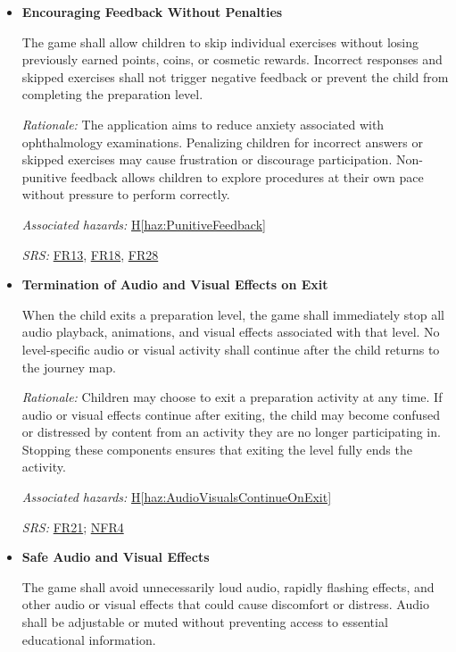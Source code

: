 \documentclass{article}
\newcounter{hazard}
\newcommand{\hazref}[1]{\hyperref[haz:#1]{H\ref*{haz:#1}}}
\newcounter{sr}
\newcommand{\srdef}[1]{\refstepcounter{sr}\label{sr:#1}\textbf{SR-\thesr:}}
\newcommand{\srsurl}{https://team-hindsight.github.io/ophthamology-game/SRS-IEEE/SRS.pdf}
\newcommand{\srsfrref}[2]{\href{\srsurl\#nameddest=#1}{FR#2}}
\newcommand{\srsnfrref}[2]{\href{\srsurl\#nameddest=#1}{NFR#2}}
\begin{document}
\begin{itemize}[leftmargin=1.5cm, labelwidth=1.3cm, labelsep=0.2cm,
  align=left, itemsep=1.2em, parsep=0.6em]
\textit{Associated hazards:}
\hazref{RestrictedLevelAccess}

\textit{SRS:} \srsfrref{FR_StartLevel}{4}

\item[\srdef{NonPunitiveFeedback}]
\textbf{Encouraging Feedback Without Penalties}

The game shall allow children to skip individual
exercises without losing previously earned points,
coins, or cosmetic rewards. Incorrect responses
and skipped exercises shall not trigger negative
feedback or prevent the child from completing
the preparation level.

\textit{Rationale:}
The application aims to reduce anxiety associated
with ophthalmology examinations. Penalizing children
for incorrect answers or skipped exercises may
cause frustration or discourage participation.
Non-punitive feedback allows children to explore
procedures at their own pace without pressure
to perform correctly.

\textit{Associated hazards:}
\hazref{PunitiveFeedback}

\textit{SRS:} \srsfrref{FR_HintOnMiss}{13}, \srsfrref{FR_NoPenalty}{18}, \srsfrref{FR_FirstReward}{28}

\item[\srdef{StopAudioVisualsOnExit}]
\textbf{Termination of Audio and Visual Effects on Exit}

When the child exits a preparation level, the game
shall immediately stop all audio playback, animations,
and visual effects associated with that level.
No level-specific audio or visual activity shall
continue after the child returns to the journey map.

\textit{Rationale:}
Children may choose to exit a preparation activity
at any time. If audio or visual effects continue
after exiting, the child may become confused or
distressed by content from an activity they are
no longer participating in. Stopping these
components ensures that exiting the level
fully ends the activity.

\textit{Associated hazards:}
\hazref{AudioVisualsContinueOnExit}

\textit{SRS:} \srsfrref{FR_StopOnExit}{21}; \srsnfrref{NFR_Exit}{4}

\item[\srdef{SafeAudioVisuals}]
\textbf{Safe Audio and Visual Effects}

The game shall avoid unnecessarily loud audio,
rapidly flashing effects, and other audio or visual
effects that could cause discomfort or distress.
Audio shall be adjustable or muted without
preventing access to essential educational
information.


\end{itemize}
\end{document}
